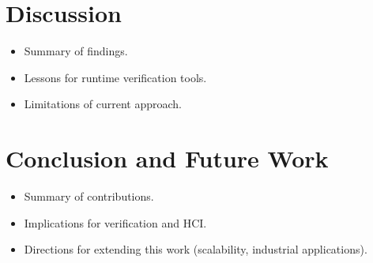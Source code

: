 \documentclass[12pt]{report}
\begin{document}
\chapter{Discussion}
\begin{itemize}
  \item Summary of findings.
  \item Lessons for runtime verification tools.
  \item Limitations of current approach.
\end{itemize}

\chapter{Conclusion and Future Work}
\begin{itemize}
  \item Summary of contributions.
  \item Implications for verification and HCI.
  \item Directions for extending this work (scalability, industrial applications).
\end{itemize}



\end{document}
